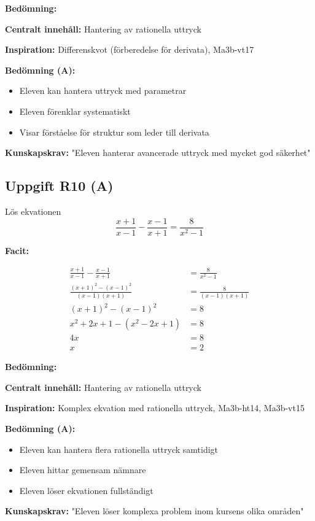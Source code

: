 \documentclass[12pt]{article}
\begin{document}
\begin{refbox}
\textbf{Bedömning:}

\textbf{Centralt innehåll:} Hantering av rationella uttryck

\textbf{Inspiration:} Differenskvot (förberedelse för derivata), Ma3b-vt17

\textbf{Bedömning (A):}
\begin{itemize}
    \item Eleven kan hantera uttryck med parametrar
    \item Eleven förenklar systematiskt
    \item Visar förståelse för struktur som leder till derivata
\end{itemize}

\textbf{Kunskapskrav:} "Eleven hanterar avancerade uttryck med mycket god säkerhet"
\end{refbox}

\subsection*{Uppgift R10 (A)}
Lös ekvationen
\[
\frac{x + 1}{x - 1} - \frac{x - 1}{x + 1} = \frac{8}{x^2 - 1}
\]

\begin{facitbox}
\textbf{Facit:}

\begin{align*}
\frac{x + 1}{x - 1} - \frac{x - 1}{x + 1} &= \frac{8}{x^2 - 1} \\
\frac{(x + 1)^2 - (x - 1)^2}{(x - 1)(x + 1)} &= \frac{8}{(x - 1)(x + 1)} \\
(x + 1)^2 - (x - 1)^2 &= 8 \\
x^2 + 2x + 1 - (x^2 - 2x + 1) &= 8 \\
4x &= 8 \\
x &= 2
\end{align*}
\end{facitbox}

\begin{refbox}
\textbf{Bedömning:}

\textbf{Centralt innehåll:} Hantering av rationella uttryck

\textbf{Inspiration:} Komplex ekvation med rationella uttryck, Ma3b-ht14, Ma3b-vt15

\textbf{Bedömning (A):}
\begin{itemize}
    \item Eleven kan hantera flera rationella uttryck samtidigt
    \item Eleven hittar gemensam nämnare
    \item Eleven löser ekvationen fullständigt
\end{itemize}

\textbf{Kunskapskrav:} "Eleven löser komplexa problem inom kursens olika områden"
\end{refbox}
\end{document}
